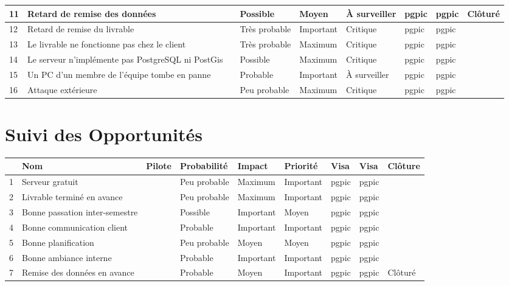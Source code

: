 \documentclass[asi]{picInsa}
\begin{document}
\begin{longtable}{|p{0.3cm}|p{2.5cm}|p{2cm}|p{2cm}|p{1.8cm}|p{1.5cm}|p{1cm}|p{1cm}|p{1.5cm}|}
			 11 & Retard de remise des données & \Sergi & Possible & Moyen & À surveiller & pgpic & pgpic & Clôturé \\\hline
			 
			 12 & Retard de remise du livrable & \Kafui & Très probable & Important & Critique & pgpic & pgpic & \\\hline
			 
			 13 & Le livrable ne fonctionne pas chez le client & \Melissa & Très probable & Maximum & Critique & pgpic & pgpic & \\\hline
			 
			 14 & Le serveur n’implémente pas PostgreSQL ni PostGis & \Sergi & Possible & Maximum & Critique & pgpic & pgpic & \\\hline
			 
			 15 & Un PC d'un membre de l'équipe tombe en panne & \Sergi & Probable & Important & À surveiller & pgpic & pgpic & \\\hline

			 16 & Attaque extérieure & \Florian & Peu probable & Maximum & Critique & pgpic & pgpic & \\\hline
			 
			 
\end{longtable}

\chapter*{Suivi des Opportunités}

\begin{longtable}{|p{0.3cm}|p{2.5cm}|p{2cm}|p{2cm}|p{1.8cm}|p{1.8cm}|p{1cm}|p{1cm}|p{1.5cm}|}
			\hline
			\rowcolor{gray!40}
			\No & Nom & Pilote & Probabilité & Impact & Priorité & Visa \RQCourt{} & Visa \CPCourt{} & Clôture \\\hline
			 1 & Serveur gratuit & \Matthieu & Peu probable & Maximum & Important & pgpic & pgpic & \\\hline
			 2 & Livrable terminé en avance & \Kafui & Peu probable & Maximum & Important & pgpic & pgpic & \\\hline
			 3 & Bonne passation inter-semestre & \Sergi & Possible & Important & Moyen & pgpic & pgpic & \\\hline
			 4 & Bonne communication client & \Florian & Probable & Important & Important & pgpic & pgpic & \\\hline
			 5 & Bonne planification & \Sergi & Peu probable & Moyen & Moyen & pgpic & pgpic & \\\hline
			 6 & Bonne ambiance interne & \Michel & Probable & Important & Important & pgpic & pgpic & \\\hline
			 7 & Remise des données en avance & \Sergi & Probable & Moyen & Important & pgpic & pgpic & Clôturé \\\hline
\end{longtable}
\end{document}

